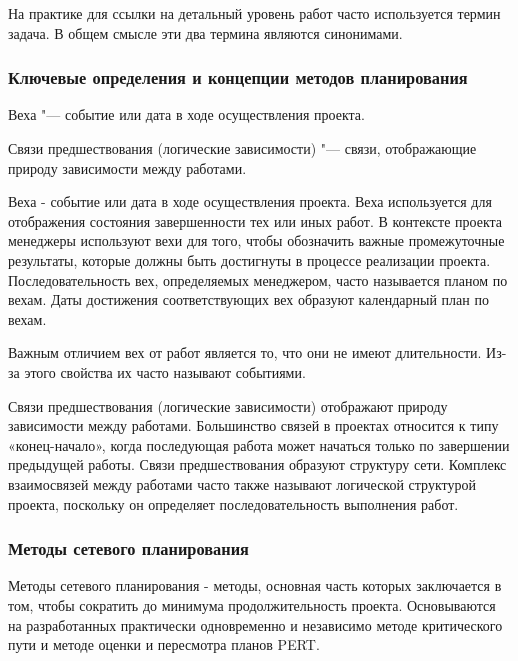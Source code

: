 \documentclass{../industrial-development}
\begin{document}
На практике для ссылки на детальный уровень работ часто используется термин задача. В общем смысле эти два термина являются синонимами.

    \begin{frame} \frametitle{Ключевые определения и концепции методов планирования}
        \begin{definition}
          Веха "--- событие или дата в ходе осуществления проекта.
        \end{definition}
        \begin{definition}
          Связи предшествования (логические зависимости) "--- связи, отображающие природу зависимости между работами.
        \end{definition}
    \end{frame}
    \lecturenotes

Веха - событие или дата в ходе осуществления проекта. Веха используется для отображения состояния завершенности тех или иных работ. В контексте проекта менеджеры используют вехи для того, чтобы обозначить важные промежуточные результаты, которые должны быть достигнуты в процессе реализации проекта. Последовательность вех, определяемых менеджером, часто называется планом по вехам. Даты достижения соответствующих вех образуют календарный план по вехам.

Важным отличием вех от работ является то, что они не имеют длительности. Из-за этого свойства их часто называют событиями.

Связи предшествования (логические зависимости) отображают природу зависимости между работами. Большинство связей в проектах относится к типу «конец-начало», когда последующая работа может начаться только по завершении предыдущей работы. Связи предшествования образуют структуру сети. Комплекс взаимосвязей между работами часто также называют логической структурой проекта, поскольку он определяет последовательность выполнения работ.

    \begin{frame} \frametitle{Методы сетевого планирования}
        \begin{definition}
Методы сетевого планирования - методы, основная часть которых заключается в том, чтобы сократить до минимума продолжительность проекта. Основываются на разработанных практически одновременно и независимо методе критического пути и методе оценки и пересмотра планов PERT.
        \end{definition}
    \end{frame}
    \lecturenotes
\end{document}
